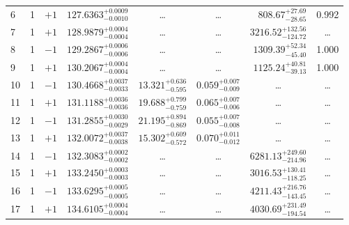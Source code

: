 \begin{table*}[!]
\begin{tabular}{llcrrlrc}
6 & 1 & $+1$ & $    127.6363_{-      0.0010}^{+      0.0009}$ & \multicolumn{1}{c}{\dots} & \multicolumn{1}{c}{\dots} & $      808.67_{-       28.65}^{+       27.69}$ & 0.992\\[1pt]
7 & 1 & $+1$ & $    128.9879_{-      0.0004}^{+      0.0004}$ & \multicolumn{1}{c}{\dots} & \multicolumn{1}{c}{\dots} & $     3216.52_{-      124.72}^{+      132.56}$ & \dots \\[1pt]
8 & 1 & $-1$ & $    129.2867_{-      0.0006}^{+      0.0006}$ & \multicolumn{1}{c}{\dots} & \multicolumn{1}{c}{\dots} & $     1309.39_{-       45.40}^{+       52.34}$ & 1.000\\[1pt]
9 & 1 & $+1$ & $    130.2067_{-      0.0004}^{+      0.0004}$ & \multicolumn{1}{c}{\dots} & \multicolumn{1}{c}{\dots} & $     1125.24_{-       39.13}^{+       40.81}$ & 1.000\\[1pt]
10 & 1 & $-1$ & $    130.4668_{-      0.0033}^{+      0.0037}$ & $      13.321_{-       0.595}^{+       0.636}$ & $       0.059_{-       0.009}^{+       0.007}$ & \multicolumn{1}{c}{\dots} & \dots \\[1pt]
11 & 1 & $+1$ & $    131.1188_{-      0.0036}^{+      0.0036}$ & $      19.688_{-       0.759}^{+       0.799}$ & $       0.065_{-       0.006}^{+       0.007}$ & \multicolumn{1}{c}{\dots} & \dots \\[1pt]
12 & 1 & $-1$ & $    131.2855_{-      0.0029}^{+      0.0030}$ & $      21.195_{-       0.869}^{+       0.894}$ & $       0.055_{-       0.008}^{+       0.007}$ & \multicolumn{1}{c}{\dots} & \dots \\[1pt]
13 & 1 & $+1$ & $    132.0072_{-      0.0038}^{+      0.0037}$ & $      15.302_{-       0.572}^{+       0.609}$ & $       0.070_{-       0.012}^{+       0.011}$ & \multicolumn{1}{c}{\dots} & \dots \\[1pt]
14 & 1 & $-1$ & $    132.3083_{-      0.0002}^{+      0.0002}$ & \multicolumn{1}{c}{\dots} & \multicolumn{1}{c}{\dots} & $     6281.13_{-      214.96}^{+      249.60}$ & \dots\\[1pt]
15 & 1 & $+1$ & $    133.2450_{-      0.0003}^{+      0.0003}$ & \multicolumn{1}{c}{\dots} & \multicolumn{1}{c}{\dots} & $     3016.53_{-      118.25}^{+      130.41}$ & \dots\\[1pt]
16 & 1 & $-1$ & $    133.6295_{-      0.0005}^{+      0.0005}$ & \multicolumn{1}{c}{\dots} & \multicolumn{1}{c}{\dots} & $     4211.43_{-      143.45}^{+      216.76}$ & \dots\\[1pt]
17 & 1 & $+1$ & $    134.6105_{-      0.0004}^{+      0.0004}$ & \multicolumn{1}{c}{\dots} & \multicolumn{1}{c}{\dots} & $     4030.69_{-      194.54}^{+      231.49}$ & \dots\\[1pt]


\end{tabular}
\end{table*}
